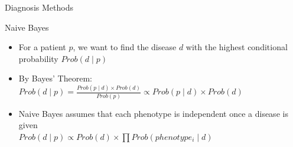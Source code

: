 \documentclass[final]{beamer} %
\begin{document}
\begin{frame}{}
\begin{columns}[T]
\begin{column}{0.3\linewidth}
\begin{block}{\Huge Diagnosis Methods}
     \begin{block}{\Large Naive Bayes}
     \begin{itemize}
        \Large
    \item
    For a patient $p$, we want to find the disease $d$ with the highest conditional probability $Prob(d \mid p )$
  \vspace{1cm}
  \item
   By Bayes' Theorem: \\
   $Prob(d \mid p) = \frac{Prob(p \mid d) \times Prob(d)}{Prob(p)} \propto Prob(p \mid d) \times Prob(d)$
  \vspace{1cm}
   \item
   Naive Bayes assumes that each phenotype is independent once a disease is given \\
   $Prob(d \mid p) \propto Prob(d) \times \prod Prob(phenotype_i \mid d)$
     \end{itemize}
   \end{block}
    \vspace{1cm}


\end{block}
\end{column}
\end{columns}
\end{frame}
\end{document}
